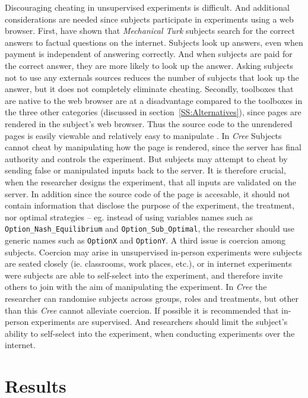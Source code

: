 \documentclass[preprint, 12pt]{elsarticle}
\newcommand{\Cree}{\emph{Cree}\xspace}
\begin{document}
Discouraging cheating in unsupervised experiments is difficult. And additional considerations are needed since subjects participate in experiments using a web browser. First, \cite{Goodman_Cryder_Cheema_2013} have shown that \emph{Mechanical Turk} subjects search for the correct answers to factual questions on the internet. Subjects look up answers, even when payment is independent of answering correctly. And when subjects are paid for the correct answer, they are more likely to look up the answer. Asking subjects not to use any externals sources reduces the number of subjects that look up the answer, but it does not completely eliminate cheating. Secondly, toolboxes that are native to the web browser are at a disadvantage compared to the toolboxes in the three other categories (discussed in section~\ref{SS:Alternatives}), since pages are rendered in the subject's web browser. Thus the source code to the unrendered pages is easily viewable and relatively easy to manipulate \citep[25m. 12s.]{Hawkes_2011}. In \Cree Subjects cannot cheat by manipulating how the page is rendered, since the server has final authority and controls the experiment. But subjects may attempt to cheat by sending false or manipulated inputs back to the server. It is therefore crucial, when the researcher designs the experiment, that all inputs are validated on the server. In addition since the source code of the page is accesable, it should not contain information that disclose the purpose of the experiment, the treatment, nor optimal strategies -- eg. instead of using variables names such as \texttt{Option\_Nash\_Equilibrium} and \texttt{Option\_Sub\_Optimal}, the researcher should use generic names such as \texttt{OptionX} and \texttt{OptionY}. A third issue is coercion among subjects. Coercion may arise in unsupervised in-person experiments were subjects are seated closely (ie. classrooms, work places, etc.), or in internet experiments were subjects are able to self-select into the experiment, and therefore invite others to join with the aim of manipulating the experiment. In \Cree the researcher can randomise subjects across groups, roles and treatments, but other than this \Cree cannot alleviate coercion. If possible it is recommended that in-person experiments are supervised. And researchers should limit the subject's ability to self-select into the experiment, when conducting experiments over the internet. 


\section{Results}
\label{S:Results}
\end{document}
